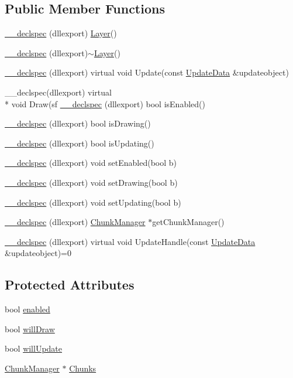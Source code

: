 \subsection*{Public Member Functions}
\begin{DoxyCompactItemize}
\item 
\hyperlink{class_layer_aef82e8c88a73de071f2951744dd5fbc7}{\-\_\-\-\_\-declspec} (dllexport) \hyperlink{class_layer}{Layer}()
\item 
\hyperlink{class_layer_ae17eacb9709778961a8f044834963c92}{\-\_\-\-\_\-declspec} (dllexport)$\sim$\hyperlink{class_layer}{Layer}()
\item 
\hyperlink{class_layer_af4209cdfc6e8685586be81f69a8b155a}{\-\_\-\-\_\-declspec} (dllexport) virtual void Update(const \hyperlink{class_update_data}{Update\-Data} \&updateobject)
\item 
\-\_\-\-\_\-declspec(dllexport) virtual \\*
void Draw(sf \hyperlink{class_layer_a803481a463be933245ccf8a99eda9641}{\-\_\-\-\_\-declspec} (dllexport) bool is\-Enabled()
\item 
\hyperlink{class_layer_adf8adf7a53cb647e84d749379930d897}{\-\_\-\-\_\-declspec} (dllexport) bool is\-Drawing()
\item 
\hyperlink{class_layer_a4b55bc3ac94c62d356bfc30f08382d6b}{\-\_\-\-\_\-declspec} (dllexport) bool is\-Updating()
\item 
\hyperlink{class_layer_aabba8310bc18ddf8488cd5685baab5e7}{\-\_\-\-\_\-declspec} (dllexport) void set\-Enabled(bool b)
\item 
\hyperlink{class_layer_a5065c5c2027ec45a40870adca41522fc}{\-\_\-\-\_\-declspec} (dllexport) void set\-Drawing(bool b)
\item 
\hyperlink{class_layer_a17a99eb35b1d1780c45acd3af6e4ffa2}{\-\_\-\-\_\-declspec} (dllexport) void set\-Updating(bool b)
\item 
\hyperlink{class_layer_a7fe1685bbc80b73fe42a2cc0c58a272d}{\-\_\-\-\_\-declspec} (dllexport) \hyperlink{class_chunk_manager}{Chunk\-Manager} $\ast$get\-Chunk\-Manager()
\item 
\hyperlink{class_layer_ac3e5ac27992462570451a077f3b629ba}{\-\_\-\-\_\-declspec} (dllexport) virtual void Update\-Handle(const \hyperlink{class_update_data}{Update\-Data} \&updateobject)=0
\end{DoxyCompactItemize}
\subsection*{Protected Attributes}
\begin{DoxyCompactItemize}
\item 
bool \hyperlink{class_layer_af9f9c9a8c4a053bd829a06273df297bd}{enabled}
\item 
bool \hyperlink{class_layer_a64902a81921ba2fc792d044392b14ecc}{will\-Draw}
\item 
bool \hyperlink{class_layer_a8c3badeb437135a265c931f4ee728a48}{will\-Update}
\item 
\hyperlink{class_chunk_manager}{Chunk\-Manager} $\ast$ \hyperlink{class_layer_ab5408f6d27ad51d73df507296f16c811}{Chunks}
\end{DoxyCompactItemize}


